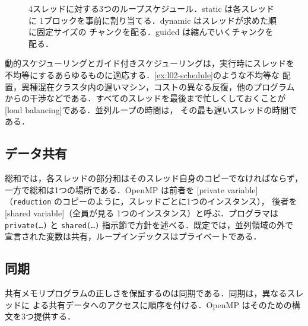 \documentclass[../main.tex]{subfiles}
\begin{document}
\begin{figure}[tb]
  \centering
  
  \caption{4スレッドに対する3つのループスケジュール．static は各スレッドに
    1ブロックを事前に割り当てる．dynamic はスレッドが求めた順に固定サイズの
    チャンクを配る．guided は縮んでいくチャンクを配る．}
  \label{fig:l02-schedule}
\end{figure}

動的スケジューリングとガイド付きスケジューリングは，実行時にスレッドを
不均等にするあらゆるものに適応する．\cref{ex:l02-schedule}のような不均等な
配置，異種混在クラスタ内の遅いマシン，コストの異なる反復，他のプログラム
からの干渉などである．すべてのスレッドを最後まで忙しくしておくことが
[load balancing]である．並列ループの時間は，
その最も遅いスレッドの時間である．

\subsection{データ共有}

総和では，各スレッドの部分和はそのスレッド自身のコピーでなければならず，
一方で総和は1つの場所である．OpenMP は前者を
[private variable]
（\texttt{reduction} のコピーのように，スレッドごとに1つのインスタンス），
後者を[shared variable]（全員が見る
1つのインスタンス）と呼ぶ．プログラマは \texttt{private(\ldots)} と
\texttt{shared(\ldots)} 指示節で方針を述べる．既定では，並列領域の外で
宣言された変数は共有，ループインデックスはプライベートである．

\subsection{同期}

共有メモリプログラムの正しさを保証するのは同期である．同期は，異なるスレッドに
よる共有データへのアクセスに順序を付ける．OpenMP はそのための構文を3つ提供する．
\end{document}
